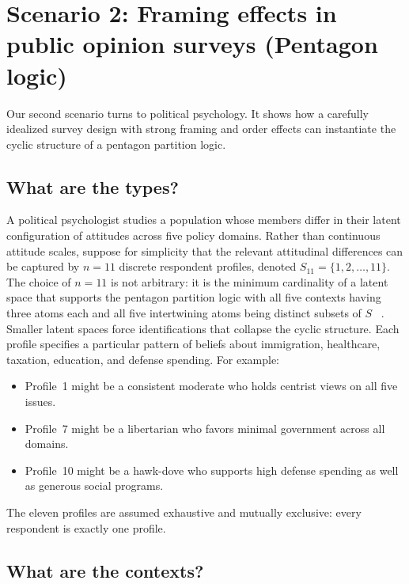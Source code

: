 \documentclass[aps,pra,twocolumn,superscriptaddress,floatfix,longbibliography]{revtex4-2}
\begin{document}
\section{Scenario 2: Framing effects in public opinion surveys
(Pentagon logic)}
\label{sec:surveys}

Our second scenario turns to political psychology. It shows how a
carefully idealized survey design with strong framing and order
effects can instantiate the cyclic structure of a pentagon partition
logic.

\subsection{What are the types?}

A political psychologist studies a population whose members differ
in their latent configuration of attitudes across five policy
domains. Rather than continuous attitude scales, suppose for
simplicity that the relevant attitudinal differences can be captured
by $n=11$ discrete respondent profiles, denoted
$S_{11}=\{1,2,\ldots,11\}$. The choice of $n=11$ is not arbitrary:
it is the minimum cardinality of a latent space that supports the
pentagon partition logic with all five contexts having three atoms
each and all five intertwining atoms being distinct subsets of $S$
~\cite[p.~267, Fig.~2]{wright:pent}. Smaller latent spaces force
identifications that collapse the cyclic structure. Each profile
specifies a particular pattern of beliefs about immigration,
healthcare, taxation, education, and defense spending. For example:
\begin{itemize}
\item Profile~1 might be a consistent moderate who holds centrist
views on all five issues.
\item Profile~7 might be a libertarian who favors minimal government
across all domains.
\item Profile~10 might be a hawk-dove who supports high defense
spending as well as generous social programs.
\end{itemize}
The eleven profiles are assumed exhaustive and mutually exclusive:
every respondent is exactly one profile.

\subsection{What are the contexts?}
\end{document}
